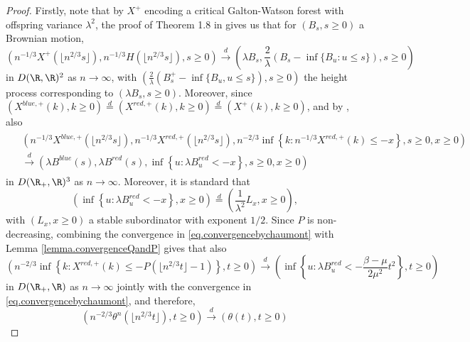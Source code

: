 \begin{proof} 
Firstly, note that by $X^+$ encoding a critical Galton-Watson forest with offspring variance $\lambda^2$, the proof of Theorem 1.8 in \cite{legallRandomTreesApplications2005} gives us that for $(B_s,s\geq 0)$ a Brownian motion,
\begin{equation}\label{eq.convergenceX}\left(n^{-1/3}X^+\left(\lfloor n^{2/3}s\rfloor \right), n^{-1/3}H\left(\lfloor n^{2/3}s\rfloor \right), s\geq 0 \right) \overset{d}{\to} \left(\lambda B_s,\frac{2}{\lambda} \left(B_s-\inf\{B_u:u\leq s\}\right),  s\geq 0\right) \end{equation}
 in $D(\R,\R)^2$ as $n\to \infty$, with $\left(\frac{2}{\lambda}(B^+_s-\inf\{B_u,u\leq s\}),s\geq 0\right)$ the height process corresponding to $\left(\lambda B_s,s \geq 0\right)$. Moreover, since $(X^{blue,+}(k),k\geq 0)\overset{d}{=}(X^{red,+}(k),k\geq 0)\overset{d}{=}(X^+(k),k\geq 0)$, and by \cite{chaumontInvariancePrinciplesLocal2010}, also
\begin{align}\begin{split}\label{eq.convergencebychaumont}&\left(n^{-1/3}X^{blue,+}\left(\lfloor n^{2/3} s \rfloor \right), n^{-1/3}X^{red,+}\left(\lfloor n^{2/3} s \rfloor \right), n^{-2/3}\inf\left\{k:n^{-1/3}X^{red,+}(k) \leq -x\right\}, s \geq 0, x\geq 0 \right)\\
&\overset{d}{\to}\left(\lambda B^{blue}(s), \lambda B^{red}(s), \inf\left\{u:\lambda B^{red}_u < -x\right\}, s\geq 0, x \geq 0\right)\end{split}\end{align}
in $D(\R_+,\R)^3$ as $n\to \infty$. Moreover, it is standard that 
\begin{equation}\label{eq.hittingtimestableprocess}\left(\inf\left\{u:\lambda B^{red}_u < -x\right\},x\geq 0\right)\overset{d}{=}\left(\frac{1}{\lambda^2}L_x,x\geq 0\right),\end{equation}
with $(L_x,x\geq 0)$ a stable subordinator with exponent $1/2$.
Since $P$ is non-decreasing, combining the convergence in \eqref{eq.convergencebychaumont} with Lemma \ref{lemma.convergenceQandP} gives that also
$$\left(n^{-2/3}\inf\left\{k:X^{red,+}(k) \leq - P\left(\lfloor n^{2/3} t \rfloor -1\right)\right\},t\geq 0\right)\overset{d}{\to}\left(\inf\left\{u:\lambda B^{red}_u< -\frac{\beta - \mu}{2\mu^2} t^2\right\},t\geq 0\right)$$
  in $D(\R_+,\R)$ as $n\to \infty$ jointly with the convergence in \eqref{eq.convergencebychaumont},
  and therefore, 
 \begin{equation}\label{eq.convergencetheta}\left(n^{-2/3}\theta^n\left(\lfloor n^{2/3}t\rfloor \right),t\geq 0 \right) \overset{d}{\to} \left(\theta(t),t\geq 0\right)\end{equation}

\end{proof}
